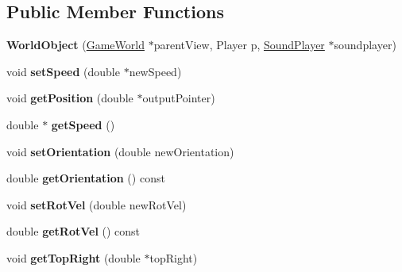 \subsection*{Public Member Functions}
\begin{DoxyCompactItemize}
\item 
{\bfseries World\+Object} (\hyperlink{class_game_world}{Game\+World} $\ast$parent\+View, Player p, \hyperlink{class_sound_player}{Sound\+Player} $\ast$soundplayer)\hypertarget{class_world_object_a064fcf6f95ab0bcef4eaacaad35d1aee}{}\label{class_world_object_a064fcf6f95ab0bcef4eaacaad35d1aee}

\item 
void {\bfseries set\+Speed} (double $\ast$new\+Speed)\hypertarget{class_world_object_a0a4c93b5c06696aa664aae256d5378d9}{}\label{class_world_object_a0a4c93b5c06696aa664aae256d5378d9}

\item 
void {\bfseries get\+Position} (double $\ast$output\+Pointer)\hypertarget{class_world_object_a5e4d104947f9068c4d84669aad29c792}{}\label{class_world_object_a5e4d104947f9068c4d84669aad29c792}

\item 
double $\ast$ {\bfseries get\+Speed} ()\hypertarget{class_world_object_a4a9c0e80e36b49cd7d4f574ca6351249}{}\label{class_world_object_a4a9c0e80e36b49cd7d4f574ca6351249}

\item 
void {\bfseries set\+Orientation} (double new\+Orientation)\hypertarget{class_world_object_a0dbc4225453661d4578c7fd9eb00ab73}{}\label{class_world_object_a0dbc4225453661d4578c7fd9eb00ab73}

\item 
double {\bfseries get\+Orientation} () const \hypertarget{class_world_object_a19516f1bc3450350c42cfe467dabf4f8}{}\label{class_world_object_a19516f1bc3450350c42cfe467dabf4f8}

\item 
void {\bfseries set\+Rot\+Vel} (double new\+Rot\+Vel)\hypertarget{class_world_object_a4fc971089870ff9db55c767694056f2f}{}\label{class_world_object_a4fc971089870ff9db55c767694056f2f}

\item 
double {\bfseries get\+Rot\+Vel} () const \hypertarget{class_world_object_a92c64315b40802ee97bf3cd5f16a3538}{}\label{class_world_object_a92c64315b40802ee97bf3cd5f16a3538}

\item 
void {\bfseries get\+Top\+Right} (double $\ast$top\+Right)\hypertarget{class_world_object_a4e9ecc19617703dcb35ccf6fd8cd1c5b}{}\label{class_world_object_a4e9ecc19617703dcb35ccf6fd8cd1c5b}


\end{DoxyCompactItemize}
